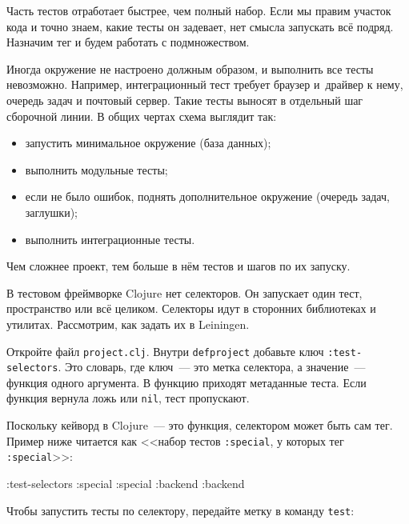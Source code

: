 Часть тестов отработает быстрее, чем полный набор. Если мы правим участок кода
и точно знаем, какие тесты он задевает, нет смысла запускать всё
подряд. Назначим тег и будем работать с подмножеством.

Иногда окружение не настроено должным образом, и выполнить все тесты
невозможно. Например, интеграционный тест требует браузер и~драйвер к нему,
очередь задач и почтовый сервер. Такие тесты выносят в отдельный шаг сборочной
линии. В общих чертах схема выглядит так:

\begin{itemize}

\item
  запустить минимальное окружение (база данных);

\item
  выполнить модульные тесты;

\item
  если не было ошибок, поднять дополнительное окружение (очередь задач,
  заглушки);

\item
  выполнить интеграционные тесты.

\end{itemize}

\noindent
Чем сложнее проект, тем больше в нём тестов и шагов по их запуску.

В тестовом фреймворке Clojure нет селекторов. Он запускает один тест,
пространство или всё целиком. Селекторы идут в сторонних библиотеках и
утилитах. Рассмотрим, как задать их в Leiningen.

Откройте файл \verb|project.clj|. Внутри \verb|defproject| добавьте ключ
\verb|:test-selectors|. Это словарь, где ключ~--- это метка селектора, а
значение~--- функция одного аргумента. В функцию приходят метаданные теста. Если
функция вернула ложь или \verb|nil|, тест пропускают.

Поскольку кейворд в Clojure~--- это функция, селектором может быть сам тег. Пример
ниже читается как <<набор тестов \verb|:special|, у которых тег \verb|:special|>>:

\begin{english}
  \begin{clojure}
:test-selectors {:special :special
                 :backend :backend}
  \end{clojure}
\end{english}

\noindent
Чтобы запустить тесты по селектору, передайте метку в команду \verb|test|:

